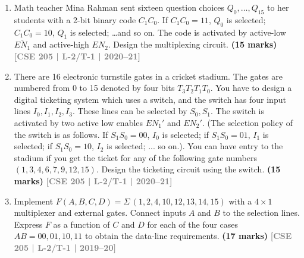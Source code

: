 \documentclass[12pt]{article}
\newcommand{\yr}[1]{\hfill\textcolor{gray}{\small\textbf{[#1]}}}
\newcommand{\mk}[1]{\textcolor{orange!70!black}{\small\textbf{(#1 marks)}}}
\begin{document}
\begin{enumerate}
\begin{center}
\end{center}

\mk{12} \yr{CSE 205 | L-2/T-1 | 2021--22}

\item Math teacher Mina Rahman sent sixteen question choices $Q_0,\ldots,Q_{15}$ to her students with a 2-bit binary code $C_1C_0$. If $C_1C_0=11$, $Q_0$ is selected; $C_1C_0=10$, $Q_1$ is selected; \ldots and so on. The code is activated by active-low $\overline{EN_1}$ and active-high $EN_2$. Design the multiplexing circuit.
\mk{15} \yr{CSE 205 | L-2/T-1 | 2020--21}

\item There are 16 electronic turnstile gates in a cricket stadium. The gates are numbered from 0 to 15 denoted by four bits $T_3T_2T_1T_0$. You have to design a digital ticketing system which uses a switch, and the switch has four input lines $I_0, I_1, I_2, I_3$. These lines can be selected by $S_0, S_1$. The switch is activated by two active low enables $EN_1'$ and $EN_2'$. (The selection policy of the switch is as follows. If $S_1S_0 = 00$, $I_0$ is selected; if $S_1S_0 = 01$, $I_1$ is selected; if $S_1S_0 = 10$, $I_2$ is selected; ... so on.). You can have entry to the stadium if you get the ticket for any of the following gate numbers $(1, 3, 4, 6, 7, 9, 12, 15)$. Design the ticketing circuit using the switch.
\mk{15} \yr{CSE 205 | L-2/T-1 | 2020--21}

\item Implement $F(A,B,C,D) = \Sigma\,(1,2,4,10,12,13,14,15)$ with a $4\times1$ multiplexer and external gates. Connect inputs $A$ and $B$ to the selection lines. Express $F$ as a function of $C$ and $D$ for each of the four cases $AB=00,01,10,11$ to obtain the data-line requirements.
\mk{17} \yr{CSE 205 | L-2/T-1 | 2019--20}


\end{enumerate}
\end{document}
